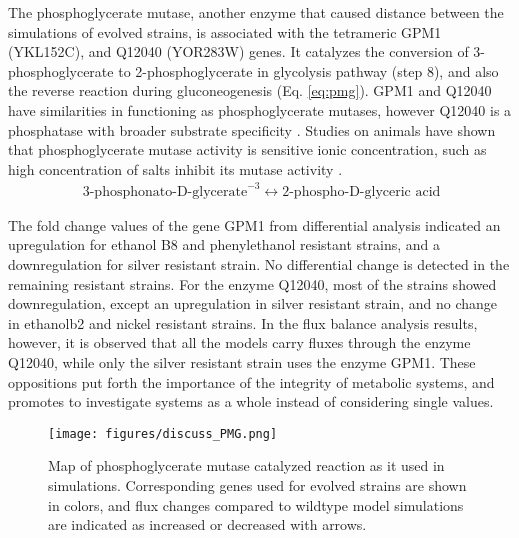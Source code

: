 The phosphoglycerate mutase, another enzyme that caused distance between the simulations of evolved strains, is associated with the tetrameric GPM1 (YKL152C), and Q12040 (YOR283W) genes. It catalyzes the conversion of 3-phosphoglycerate to 2-phosphoglycerate in glycolysis pathway (step 8), and also the reverse reaction during gluconeogenesis (Eq. \ref{eq:pmg}). GPM1 and Q12040 have similarities in functioning as phosphoglycerate mutases, however Q12040 is a phosphatase with broader substrate specificity \cite{ho2009identification}. Studies on animals have shown that phosphoglycerate mutase activity is sensitive ionic concentration, such as high concentration of salts inhibit its mutase activity \cite{grisolia1967mercury}.
\begin{align}
  \label{eq:pmg}
  \ \text{3-phosphonato-D-glycerate}^{-3} \leftrightarrow \text{2-phospho-D-glyceric acid}
\end{align}

The fold change values of the gene GPM1 from differential analysis indicated an upregulation for ethanol B8 and phenylethanol resistant strains, and a downregulation for silver resistant strain. No differential change is detected in the remaining resistant strains. For the enzyme Q12040, most of the strains showed downregulation, except an upregulation in silver resistant strain, and no change in ethanolb2 and nickel resistant strains. In the flux balance analysis results, however, it is observed that all the models carry fluxes through the enzyme Q12040, while only the silver resistant strain uses the enzyme GPM1. These oppositions put forth the importance of the integrity of metabolic systems, and promotes to investigate systems as a whole instead of considering single values.
\begin{figure}[H]
\texttt{[image: figures/discuss\_PMG.png]}
\caption[Map of phosphoglycerate mutase catalyzed reaction as it used in simulations]{Map of phosphoglycerate mutase catalyzed reaction as it used in simulations. Corresponding genes used for evolved strains are shown in colors, and flux changes compared to wildtype model simulations are indicated as increased or decreased with arrows.}
\label{fig:discuss_PMG}
\end{figure}

